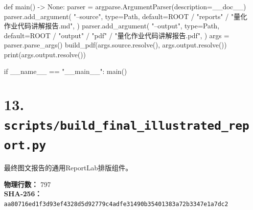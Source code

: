 \documentclass[UTF8,a4paper,fontset=fandol]{ctexart}
\begin{document}
\begin{ProjectCode}
def main() -> None:
    parser = argparse.ArgumentParser(description=__doc__)
    parser.add_argument(
        "--source",
        type=Path,
        default=ROOT / "reports" / "量化作业代码讲解报告.md",
    )
    parser.add_argument(
        "--output",
        type=Path,
        default=ROOT / "output" / "pdf" / "量化作业代码讲解报告.pdf",
    )
    args = parser.parse_args()
    build_pdf(args.source.resolve(), args.output.resolve())
    print(args.output.resolve())


if __name__ == "__main__":
    main()
\end{ProjectCode}
\clearpage
\section{13. \texttt{scripts/build\_final\_illustrated\_report.py}}
最终图文报告的通用ReportLab排版组件。

\textbf{物理行数：} 797\\
\textbf{SHA-256：} \texttt{aa80716ed1f3d93ef4328d5d92779c4adfe31490b35401383a72b3347e1a7dc2}
\end{document}
